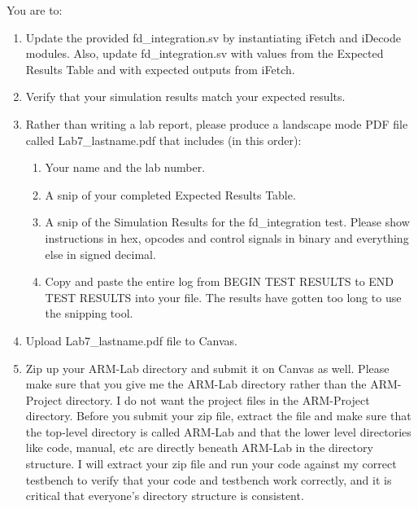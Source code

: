 You are to:
\begin{enumerate}
\item Update the provided fd\_integration.sv by instantiating iFetch and iDecode modules.  Also, update fd\_integration.sv with values from the Expected Results Table and with expected outputs from iFetch. 
\item Verify that your simulation results match your expected results.
\item Rather than writing a lab report, please produce a landscape mode PDF file called Lab7\_lastname.pdf that includes (in this order):
\begin{enumerate}
	\item Your name and the lab number.
	\item A snip of your completed Expected Results Table.
	\item A snip of the Simulation Results for the fd\_integration test.  Please show instructions in hex, opcodes and control signals in binary and everything else in signed decimal.  
	\item Copy and paste the entire log from BEGIN TEST RESULTS to END TEST RESULTS into your file.  The results have gotten too long to use the snipping tool.	
\end{enumerate}
\item Upload Lab7\_lastname.pdf file to Canvas.
\item Zip up your ARM-Lab directory and submit it on Canvas as well.  Please make sure that you give me the ARM-Lab directory rather than the ARM-Project directory.  I do not want the project files in the ARM-Project directory.  Before you submit your zip file, extract the file and make sure that the top-level directory is called ARM-Lab and that the lower level directories like code, manual, etc are directly beneath ARM-Lab in the directory structure.  I will extract your zip file and run your code against my correct testbench to verify that your code and testbench work correctly, and it is critical that everyone's directory structure is consistent.
\end{enumerate} 